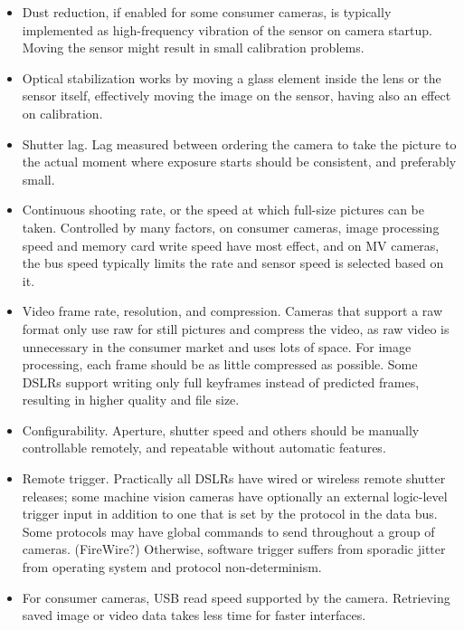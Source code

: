 \begin{itemize}
	\item Dust reduction, if enabled for some consumer cameras, is typically implemented as high-frequency vibration of the sensor on camera startup. Moving the sensor might result in small calibration problems.

	\item Optical stabilization works by moving a glass element inside the lens or the sensor itself, effectively moving the image on the sensor, having also an effect on calibration.

	\item Shutter lag. Lag measured between ordering the camera to take the picture to the actual moment where exposure starts should be consistent, and preferably small.

	\item Continuous shooting rate, or the speed at which full-size pictures can be taken. Controlled by many factors, on consumer cameras, image processing speed and memory card write speed have most effect, and on MV cameras, the bus speed typically limits the rate and sensor speed is selected based on it.

	\item Video frame rate, resolution, and compression. Cameras that support a raw format only use raw for still pictures and compress the video, as raw video is unnecessary in the consumer market and uses lots of space. For image processing, each frame should be as little compressed as possible. Some DSLRs support writing only full keyframes instead of predicted frames, resulting in higher quality and file size.

	\item Configurability. Aperture, shutter speed and others should be manually controllable remotely, and repeatable without automatic features.

	\item Remote trigger. Practically all DSLRs have wired or wireless remote shutter releases; some machine vision cameras have optionally an external logic-level trigger input in addition to one that is set by the protocol in the data bus. Some protocols may have global commands to send throughout a group of cameras. (FireWire?) Otherwise, software trigger suffers from sporadic jitter from operating system and protocol non-determinism.

	\item For consumer cameras, USB read speed supported by the camera. Retrieving saved image or video data takes less time for faster interfaces.


\end{itemize}
